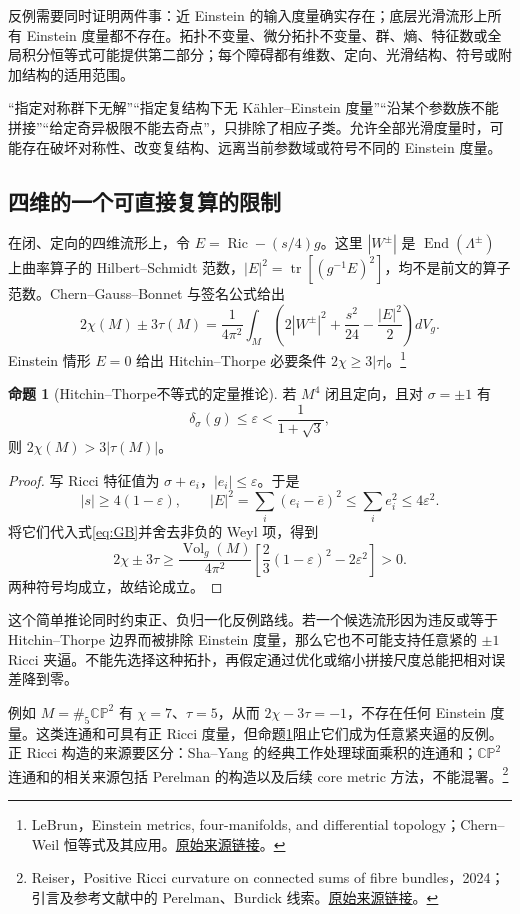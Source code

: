 \documentclass[11pt,a4paper]{article}
\theoremstyle{definition}
\newtheorem{proposition}[definition]{命题}
\newcommand{\Ric}{\operatorname{Ric}}
\newcommand{\Vol}{\operatorname{Vol}}
\newcommand{\tr}{\operatorname{tr}}
\newcommand{\src}[3]{\footnote{\raggedright #1，#2。\href{#3}{原始来源链接}。}}
\begin{document}
反例需要同时证明两件事：近 Einstein 的输入度量确实存在；底层光滑流形上所有 Einstein 度量都不存在。拓扑不变量、微分拓扑不变量、群、熵、特征数或全局积分恒等式可能提供第二部分；每个障碍都有维数、定向、光滑结构、符号或附加结构的适用范围。

“指定对称群下无解”“指定复结构下无 Kähler--Einstein 度量”“沿某个参数族不能拼接”“给定奇异极限不能去奇点”，只排除了相应子类。允许全部光滑度量时，可能存在破坏对称性、改变复结构、远离当前参数域或符号不同的 Einstein 度量。

\subsection{四维的一个可直接复算的限制}

在闭、定向的四维流形上，令 $E=\Ric-(s/4)g$。这里 $|W^\pm|$ 是 $\operatorname{End}(\Lambda^\pm)$ 上曲率算子的 Hilbert--Schmidt 范数，$|E|^2=\tr[(g^{-1}E)^2]$，均不是前文的算子范数。Chern--Gauss--Bonnet 与签名公式给出
\begin{equation}\label{eq:GB}
2\chi(M)\pm3\tau(M)=\frac1{4\pi^2}\int_M
\left(2|W^\pm|^2+\frac{s^2}{24}-\frac{|E|^2}{2}\right)dV_g.
\end{equation}
Einstein 情形 $E=0$ 给出 Hitchin--Thorpe 必要条件 $2\chi\ge3|\tau|$。\src{LeBrun}{Einstein metrics, four-manifolds, and differential topology；Chern--Weil 恒等式及其应用}{https://arxiv.org/abs/math/0404359}

\begin{proposition}[Hitchin--Thorpe不等式的定量推论]\label{prop:gap}
若 $M^4$ 闭且定向，且对 $\sigma=\pm1$ 有
\[
\delta_\sigma(g)\le\varepsilon<\frac{1}{1+\sqrt3},
\]
则 $2\chi(M)>3|\tau(M)|$。
\end{proposition}

\begin{proof}
写 Ricci 特征值为 $\sigma+e_i$，$|e_i|\le\varepsilon$。于是
\[
|s|\ge4(1-\varepsilon),\qquad
|E|^2=\sum_i(e_i-\bar e)^2\le\sum_i e_i^2\le4\varepsilon^2.
\]
将它们代入式\eqref{eq:GB}并舍去非负的 Weyl 项，得到
\[
2\chi\pm3\tau\ge\frac{\Vol_g(M)}{4\pi^2}
\left[\frac23(1-\varepsilon)^2-2\varepsilon^2\right]>0.
\]
两种符号均成立，故结论成立。
\end{proof}

这个简单推论同时约束正、负归一化反例路线。若一个候选流形因为违反或等于 Hitchin--Thorpe 边界而被排除 Einstein 度量，那么它也不可能支持任意紧的 $\pm1$ Ricci 夹逼。不能先选择这种拓扑，再假定通过优化或缩小拼接尺度总能把相对误差降到零。

例如 $M=\#_5\mathbb{CP}^2$ 有 $\chi=7$、$\tau=5$，从而 $2\chi-3\tau=-1$，不存在任何 Einstein 度量。这类连通和可具有正 Ricci 度量，但命题\ref{prop:gap}阻止它们成为任意紧夹逼的反例。正 Ricci 构造的来源要区分：Sha--Yang 的经典工作处理球面乘积的连通和；$\mathbb{CP}^2$ 连通和的相关来源包括 Perelman 的构造以及后续 core metric 方法，不能混署。\src{Reiser}{Positive Ricci curvature on connected sums of fibre bundles，2024；引言及参考文献中的 Perelman、Burdick 线索}{https://arxiv.org/abs/2406.02274}
\end{document}
